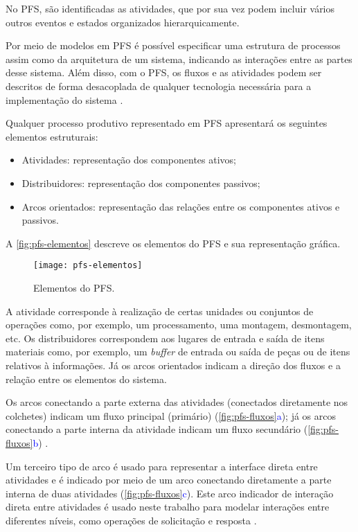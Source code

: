 No PFS, são identificadas as atividades, que por sua vez podem incluir vários outros eventos e estados organizados hierarquicamente.

Por meio de modelos em PFS é possível especificar uma estrutura de processos assim como da arquitetura de um sistema, indicando as interações entre as partes desse sistema. Além disso, com o PFS, os fluxos e as atividades podem ser descritos de forma desacoplada de qualquer tecnologia necessária para a implementação do sistema \cite{pisching2018equipmentrami}.

Qualquer processo produtivo representado em PFS apresentará os seguintes elementos estruturais:

\begin{itemize}
	\item Atividades: representação dos componentes ativos;
	\item Distribuidores: representação dos componentes passivos;
	\item Arcos orientados: representação das relações entre os componentes ativos  e passivos.
\end{itemize}

A \autoref{fig:pfs-elementos} descreve os elementos do PFS e sua representação gráfica.

\begin{figure}[htb]
	\centering
	\texttt{[image: pfs-elementos]}
	\caption{Elementos do PFS.}
	\label{fig:pfs-elementos}
\end{figure}

A atividade corresponde à realização de certas unidades ou conjuntos de operações como, por exemplo, um processamento, uma montagem, desmontagem, etc. Os distribuidores correspondem aos lugares de entrada e saída de itens materiais como, por exemplo, um \textit{buffer} de entrada ou saída de peças ou de itens relativos à informações. Já os arcos orientados indicam a direção dos fluxos e a relação entre os elementos do sistema.

Os arcos conectando a parte externa das atividades (conectados diretamente nos colchetes) indicam um fluxo principal (primário) (\autoref{fig:pfs-fluxos}\textcolor{blue}{a}); já os arcos conectando a parte interna da atividade indicam um fluxo secundário (\autoref{fig:pfs-fluxos}\textcolor{blue}{b}) \cite{miyagi1996controle}.

Um terceiro tipo de arco é usado para representar a interface direta entre atividades e é indicado por meio de um arco conectando diretamente a parte interna de duas atividades (\autoref{fig:pfs-fluxos}\textcolor{blue}{c}). Este arco indicador de interação direta entre atividades é usado neste trabalho para modelar interações entre diferentes níveis, como operações de solicitação e resposta \cite{pisching2018pfs}.

